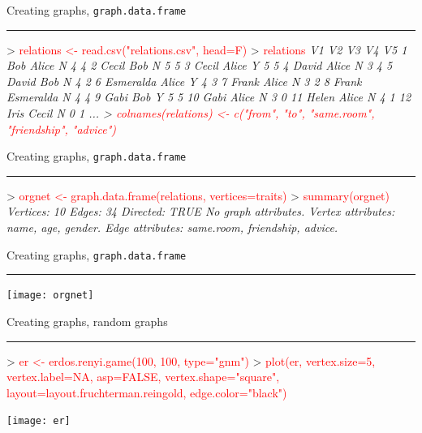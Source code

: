 \documentclass[landscape]{foils}
\newcommand{\stitle}[1]{{\centering\color{blue}\Large #1\par\vspace*{10pt}\hrule}}
\newcommand{\command}[1]{\textcolor{red}{#1}}
\begin{document}
\newpage
\stitle{Creating graphs, \texttt{graph.data.frame}}
\begin{Myverb}
> \command{relations <- read.csv("relations.csv", head=F)}
> \command{relations}
\slshape           V1        V2 V3 V4 V5
\slshape 1        Bob     Alice  N  4  4
\slshape 2      Cecil       Bob  N  5  5
\slshape 3      Cecil     Alice  Y  5  5
\slshape 4      David     Alice  N  3  4
\slshape 5      David       Bob  N  4  2
\slshape 6  Esmeralda     Alice  Y  4  3
\slshape 7      Frank     Alice  N  3  2
\slshape 8      Frank Esmeralda  N  4  4
\slshape 9       Gabi       Bob  Y  5  5
\slshape 10      Gabi     Alice  N  3  0
\slshape 11     Helen     Alice  N  4  1
\slshape 12      Iris     Cecil  N  0  1
\slshape ...
> \command{colnames(relations) <- c("from", "to", "same.room", }
\command{          "friendship", "advice")}
\end{Myverb}

\newpage
\stitle{Creating graphs, \texttt{graph.data.frame}}
\begin{Myverb}
> \command{orgnet <- graph.data.frame(relations, vertices=traits)}
> \command{summary(orgnet)}
\slshape Vertices: 10 
\slshape Edges: 34 
\slshape Directed: TRUE 
\slshape No graph attributes.
\slshape Vertex attributes: name, age, gender.
\slshape Edge attributes: same.room, friendship, advice.
\end{Myverb}

\newpage
\stitle{Creating graphs, \texttt{graph.data.frame}}
\begin{center}
\vspace*{-2cm}
\texttt{[image: orgnet]}
\end{center}

\newpage
\stitle{Creating graphs, random graphs}
\begin{Myverb}
> \command{er <- erdos.renyi.game(100, 100, type="gnm")}
> \command{plot(er, vertex.size=5, vertex.label=NA, asp=FALSE, vertex.shape="square",}
\command{       layout=layout.fruchterman.reingold, edge.color="black")}
\end{Myverb}
\begin{center}
\vspace*{-1cm}
\enlargethispage{2cm}
\texttt{[image: er]}
\end{center}
\end{document}
